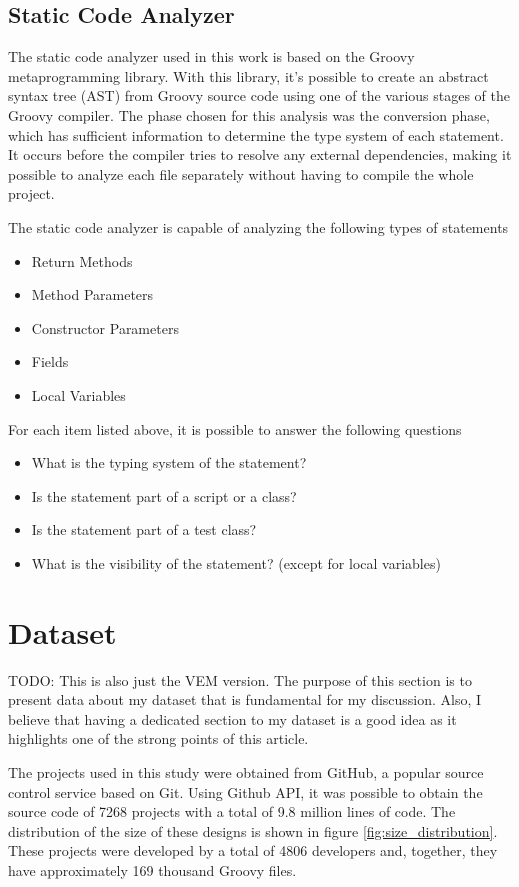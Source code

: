 \documentclass[preprint]{sigplanconf}
\begin{document}
\subsection{Static Code Analyzer}
The static code analyzer used in this work is based on the Groovy metaprogramming library. 
With this library, it's possible to create an abstract syntax tree (AST) from Groovy source code using one of the various stages of the Groovy compiler.
The phase chosen for this analysis was the conversion phase, which has sufficient information to determine the type system of each statement.
It occurs before the compiler tries to resolve any external dependencies, making it possible to analyze each file separately without having to compile the whole project.

The static code analyzer is capable of analyzing the following types of statements
\begin{itemize}
	\item Return Methods
	\item Method Parameters
	\item Constructor Parameters
	\item Fields
	\item Local Variables
\end{itemize}

For each item listed above, it is possible to answer the following questions
\begin{itemize}
	\item What is the typing system of the statement?
	\item Is the statement part of a script or a class?
	\item Is the statement part of a test class?
	\item What is the visibility of the statement? (except for local variables)
\end{itemize}





\section{Dataset\label{sec:dataset}}
TODO: This is also just the VEM version. The purpose of this section is to present data about my dataset that is fundamental for my discussion. Also, I believe that having a dedicated section to my dataset is a good idea as it highlights one of the strong points of this article.

The projects used in this study were obtained from GitHub, a popular source control service based on Git.
Using Github API, it was possible to obtain the source code of 7268 projects with a total of 9.8 million lines of code. 
The distribution of the size of these designs is shown in figure \ref{fig:size_distribution}. 
These projects were developed by a total of 4806 developers and, together, they have approximately 169 thousand Groovy files.
\end{document}
